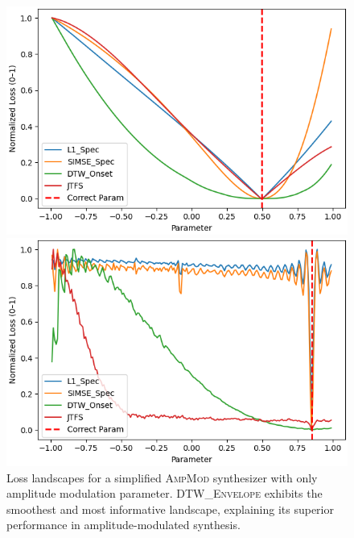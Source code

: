 \documentclass[11pt]{article}
\newcommand{\BPNoise}{\textsc{BP-Noise}}
\newcommand{\AmpMod}{\textsc{AmpMod}}
\newcommand{\DTWEnv}{\textsc{DTW\_Envelope}}
\newcommand{\SIMSESpec}{\textsc{SIMSE\_Spec}}
\newcommand{\LoneSpec}{\textsc{L1\_Spec}}
\newcommand{\JTFS}{\textsc{JTFS}}
\begin{document}
\begin{figure}[ht]
    \centering
    \begin{minipage}[t]{0.48\textwidth}
        \centering
        \includegraphics[width=\linewidth]{images/experiment_plots/comparing_loss_landscapes_normalized.png}
        \caption{Loss landscapes for \BPNoise{} with only a high-pass filter parameter. 
        \LoneSpec{}, \SIMSESpec{}, and \JTFS{} show clear global minima near the correct parameter, while \DTWEnv{} remains flat around the target.}
        \label{fig:loss_landscape_noisebp}
    \end{minipage}%
    \hfill
    \begin{minipage}[t]{0.48\textwidth}
        \centering
        \includegraphics[width=\linewidth]{images/experiment_plots/comparing_lanscapes_1_1d_normalized.png}
        \caption{Loss landscapes for a simplified \AmpMod{} synthesizer with only amplitude modulation parameter. 
        \DTWEnv{} exhibits the smoothest and most informative landscape, explaining its superior performance in amplitude-modulated synthesis.}
        \label{fig:loss_landscape_ampmod}
    \end{minipage}
\end{figure}
\end{document}
